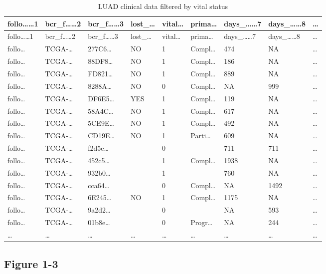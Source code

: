 \documentclass[
]{article}
\begin{document}
\begin{longtable}[]{@{}lllllllll@{}}
\caption{\label{tab:LUAD-clinical-data-filtered-by-vital-status}LUAD clinical data filtered by vital status}\tabularnewline
\toprule
follo\ldots\ldots1 & bcr\_f\ldots\ldots2 & bcr\_f\ldots\ldots3 & lost\_\ldots{} & vital\ldots{} & prima\ldots{} & days\_\ldots\ldots7 & days\_\ldots\ldots8 & \ldots{}\tabularnewline
\midrule
\endfirsthead
\toprule
follo\ldots\ldots1 & bcr\_f\ldots\ldots2 & bcr\_f\ldots\ldots3 & lost\_\ldots{} & vital\ldots{} & prima\ldots{} & days\_\ldots\ldots7 & days\_\ldots\ldots8 & \ldots{}\tabularnewline
\midrule
\endhead
follo\ldots{} & TCGA-\ldots{} & 277C6\ldots{} & NO & 1 & Compl\ldots{} & 474 & NA & \ldots{}\tabularnewline
follo\ldots{} & TCGA-\ldots{} & 88DF8\ldots{} & NO & 1 & Compl\ldots{} & 186 & NA & \ldots{}\tabularnewline
follo\ldots{} & TCGA-\ldots{} & FD821\ldots{} & NO & 1 & Compl\ldots{} & 889 & NA & \ldots{}\tabularnewline
follo\ldots{} & TCGA-\ldots{} & 8288A\ldots{} & NO & 0 & Compl\ldots{} & NA & 999 & \ldots{}\tabularnewline
follo\ldots{} & TCGA-\ldots{} & DF6E5\ldots{} & YES & 1 & Compl\ldots{} & 119 & NA & \ldots{}\tabularnewline
follo\ldots{} & TCGA-\ldots{} & 58A4C\ldots{} & NO & 1 & Compl\ldots{} & 617 & NA & \ldots{}\tabularnewline
follo\ldots{} & TCGA-\ldots{} & 5CE9E\ldots{} & NO & 1 & Compl\ldots{} & 492 & NA & \ldots{}\tabularnewline
follo\ldots{} & TCGA-\ldots{} & CD19E\ldots{} & NO & 1 & Parti\ldots{} & 609 & NA & \ldots{}\tabularnewline
follo\ldots{} & TCGA-\ldots{} & f2d5e\ldots{} & & 0 & & 711 & 711 & \ldots{}\tabularnewline
follo\ldots{} & TCGA-\ldots{} & 452c5\ldots{} & & 1 & Compl\ldots{} & 1938 & NA & \ldots{}\tabularnewline
follo\ldots{} & TCGA-\ldots{} & 932b0\ldots{} & & 1 & & 760 & NA & \ldots{}\tabularnewline
follo\ldots{} & TCGA-\ldots{} & cca64\ldots{} & & 0 & Compl\ldots{} & NA & 1492 & \ldots{}\tabularnewline
follo\ldots{} & TCGA-\ldots{} & 6E245\ldots{} & NO & 1 & Compl\ldots{} & 1175 & NA & \ldots{}\tabularnewline
follo\ldots{} & TCGA-\ldots{} & 9a2d2\ldots{} & & 0 & & NA & 593 & \ldots{}\tabularnewline
follo\ldots{} & TCGA-\ldots{} & 01b8e\ldots{} & & 0 & Progr\ldots{} & NA & 244 & \ldots{}\tabularnewline
\ldots{} & \ldots{} & \ldots{} & \ldots{} & \ldots{} & \ldots{} & \ldots{} & \ldots{} & \ldots{}\tabularnewline
\bottomrule
\end{longtable}

\hypertarget{figure-1-3}{%
\subsection{Figure 1-3}\label{figure-1-3}}
\end{document}
